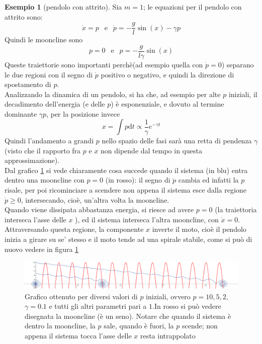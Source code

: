 \documentclass[a4paper,12pt]{article}
\theoremstyle{plain}
\theoremstyle{definition}
\newtheorem{exmp}{Esempio}[section]
\newcommand{\f}[2]{\frac{#1}{#2}}
\renewcommand{\d}{\text{d}}
\newcommand{\econg}{~\text{e}~}
\newcommand{\argg}[1]{\left(#1\right)}
\theoremstyle{remark}
\begin{document}
\begin{exmp}[pendolo con attrito]
Sia $m=1$;
le equazioni per il pendolo con attrito sono:
\[\dot{x}=p\;\;\econg\;\;\dot{p}=-\f{g}{l}\sin\argg{x}-	\gamma p	\]
Quindi le mooncline sono \[p=0\;\;\econg\;\; p=-\f{g}{l\gamma}\sin(x)\] 
Queste traiettorie sono importanti perchè(ad esempio quella con $\dot{p}=0$) separano le due regioni con il segno di $\dot{p}$ positivo o negativo, e quindi la direzione di spostamento di $p$.\\
Analizzando la dinamica di un pendolo, si ha che, ad esempio per alte $p$ iniziali, il decadimento dell'energia (e delle $p$) è esponenziale, e dovuto al termine dominante $\gamma p$, per la posizione invece \[x=\int p \d t\propto\f{1}{\gamma} e^{-\gamma t}\]
Quindi l'andamento a grandi $p$ nello spazio delle fasi sarà una retta di pendenza $\gamma$ (visto che il rapporto fra $p$ e $x$ non dipende dal tempo in questa approssimazione).\\
Dal grafico \ref{frpend} si vede chiaramente cosa succede quando il sistema (in blu) entra dentro una mooncline con $p=0$ (in rosso): il segno di $\dot{p}$ cambia ed infatti la $p$ risale, per poi ricominciare a scendere non appena il sistema esce dalla regione $\dot{p}\ge 0$, intersecando, cioè, un'altra volta la mooncline.
 \\Quando viene dissipata abbastanza energia, si riesce ad avere $p=0$ (la traiettoria interseca l'asse delle $x$ ), ed il sistema interseca l'altra mooncline, con $\dot{x}=0$. \\Attraversando questa regione, la componente $x$ inverte il moto, cioè il pendolo inizia a girare su se' stesso e il moto tende ad una spirale stabile, come si può di nuovo vedere in figura \ref{frpend}\begin{figure}[h]
	\includegraphics[scale=0.3]{Exm.png}
	\caption{Grafico ottenuto per diversi valori di $p$ iniziali, ovvero $p=10,5,2$, $\gamma=0.1$ e tutti gli altri parametri pari a $1$.In rosso si può vedere disegnata la mooncline (è un seno). Notare che quando il sistema è dentro la mooncline, la $p$ sale, quando è fuori, la $p$ scende; non appena il sistema tocca l'asse delle $x$ resta intrappolato}
	\label{frpend}
\end{figure}
	
\end{exmp}
\end{document}

